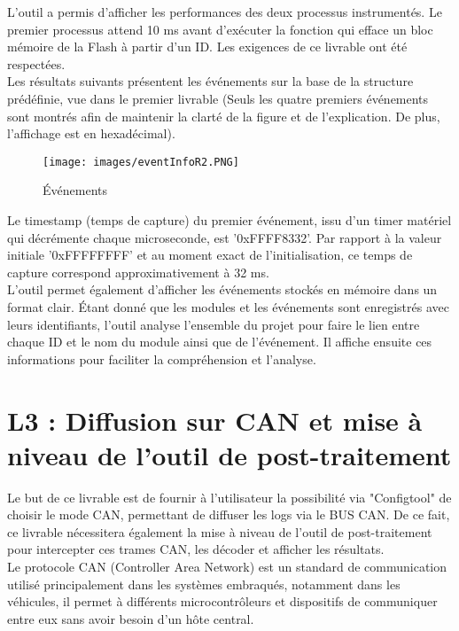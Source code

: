 \documentclass[a4paper, 12pt]{report}
\begin{document}
    L'outil a permis d'afficher les performances des deux processus instrumentés. Le premier processus attend 10 ms avant d'exécuter la fonction qui efface un bloc mémoire de la Flash à partir d'un ID. Les exigences de ce livrable ont été respectées.\\


    Les résultats suivants présentent les événements sur la base de la structure prédéfinie, vue dans le premier livrable (Seuls les quatre premiers événements sont montrés afin de maintenir la clarté de la figure et de l'explication. De plus, l'affichage est en hexadécimal).
        \begin{figure}[H]
            \centering
            \texttt{[image: images/eventInfoR2.PNG]}
            \caption{Événements}
        \end{figure}

        Le timestamp (temps de capture) du premier événement, issu d'un timer matériel qui décrémente chaque microseconde, est '0xFFFF8332'. Par rapport à la valeur initiale '0xFFFFFFFF' et au moment exact de l'initialisation, ce temps de capture correspond approximativement à 32 ms.\\
        
        L'outil permet également d'afficher les événements stockés en mémoire dans un format clair. Étant donné que les modules et les événements sont enregistrés avec leurs identifiants, l'outil analyse l'ensemble du projet pour faire le lien entre chaque \acs{ID} et le nom du module ainsi que de l'événement. Il affiche ensuite ces informations pour faciliter la compréhension et l'analyse.

\section{L3 : Diffusion sur CAN et mise à niveau de l'outil de post-traitement}
Le but de ce livrable est de fournir à l'utilisateur la possibilité via "Configtool" de choisir le mode \ac{CAN}, permettant de diffuser les logs via le BUS CAN. De ce fait, ce livrable nécessitera également la mise à niveau de l'outil de post-traitement pour intercepter ces trames CAN, les décoder et afficher les résultats.\\

Le protocole CAN (Controller Area Network) est un standard de communication utilisé principalement dans les systèmes embraqués, notamment dans les véhicules, il permet à différents microcontrôleurs et dispositifs de communiquer entre eux sans avoir besoin d'un hôte central.
\end{document}
